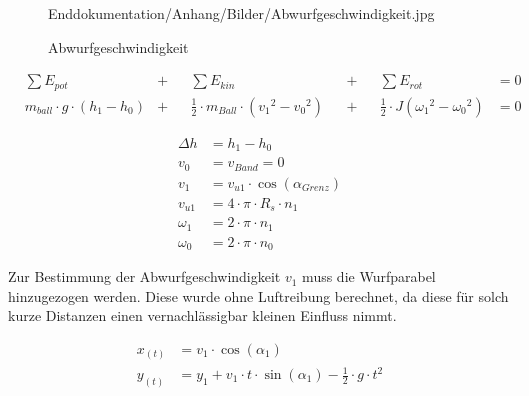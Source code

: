 \begin{figure}[h!]
\begin{minipage}[hbt]{0.4\textwidth}
        {Enddokumentation/Anhang/Bilder/Abwurfgeschwindigkeit.jpg}
        \caption{Abwurfgeschwindigkeit}
        \label{fig:Abwurfgeschwindigkeit}
    \end{minipage}
\end{figure}

\begin{align}
     &\sum E_{pot} &+&& \sum E_{kin} &&+&& \sum E_{rot} &= 0 \label{equ:Energiegleichung}\\
     & m_{ball} \cdot g \cdot \left(h_1 - h_0\right) &+&&\frac{1}{2} \cdot m_{Ball} \cdot\left( v_1{^{2}} - 
     v_0{^{2}} \right) &&+&&\frac{1}{2} \cdot J \left( \omega_1{^{2}} - \omega_0{^{2}} 
     \right) &= 0
\end{align}

\begin{align}
\Delta h &= h_1 - h_0 \\
v_0 &= v_{Band} = 0 \\
v_1 &= v_{u1} \cdot \cos(\alpha_{Grenz}) \\
v_{u1} &= 4 \cdot \pi \cdot R_s \cdot n_1 \\
\omega_1 &= 2 \cdot \pi \cdot n_1 \\
\omega_0 &= 2 \cdot \pi \cdot n_0 
\end{align}

Zur Bestimmung der Abwurfgeschwindigkeit $v_1$ muss die Wurfparabel hinzugezogen werden. 
Diese wurde ohne Luftreibung berechnet, da diese für solch kurze Distanzen einen 
vernachlässigbar kleinen Einfluss nimmt.

\begin{align}
x_{(t)} &= v_1 \cdot \cos(\alpha_1) \\
y_{(t)} &= y_1 + v_1 \cdot t \cdot \sin(\alpha_1) - \frac{1}{2} \cdot g \cdot t^2
\end{align}


